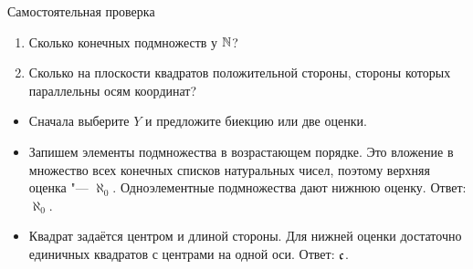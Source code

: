 \documentclass[10pt]{beamer}
\begin{document}
\begin{frame}{Самостоятельная проверка}
    \begin{enumerate}
        \item Сколько конечных подмножеств у $\mathbb{N}$?
        \item Сколько на плоскости квадратов положительной стороны, стороны которых параллельны осям координат?
    \end{enumerate}
    \begin{itemize}
        \item Сначала выберите $Y$ и предложите биекцию или две оценки.
        \item<2-> Запишем элементы подмножества в возрастающем порядке. Это вложение в множество всех конечных списков натуральных чисел, поэтому верхняя оценка "--- $\aleph_0$. Одноэлементные подмножества дают нижнюю оценку. Ответ: $\aleph_0$.
        \item<3-> Квадрат задаётся центром и длиной стороны. Для нижней оценки достаточно единичных квадратов с центрами на одной оси. Ответ: $\mathfrak{c}$.
    \end{itemize}
\end{frame}
\end{document}
